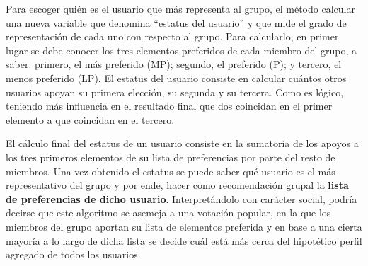 Para escoger quién es el usuario que más representa al grupo, el método calcular una nueva variable que denomina ``estatus del usuario'' y que mide el grado de representación de cada uno con respecto al grupo. Para calcularlo, en primer lugar se debe conocer los tres elementos preferidos de cada miembro del grupo, a saber: primero, el más preferido (MP); segundo, el preferido (P); y tercero, el menos preferido (LP). El estatus del usuario consiste en calcular cuántos otros usuarios apoyan su primera elección, su segunda y su tercera. Como es lógico, teniendo más influencia en el resultado final que dos coincidan en el primer elemento a que coincidan en el tercero.

El cálculo final del estatus de un usuario consiste en la sumatoria de los apoyos a los tres primeros elementos de su lista de preferencias por parte del resto de miembros. Una vez obtenido el estatus se puede saber qué usuario es el más representativo del grupo y por ende, hacer como recomendación grupal la \textbf{lista de preferencias de dicho usuario}. Interpretándolo con carácter social, podría decirse que este algoritmo se asemeja a una votación popular, en la que los miembros del grupo aportan su lista de elementos preferida y en base a una cierta mayoría a lo largo de dicha lista se decide cuál está más cerca del hipotético perfil agregado de todos los usuarios.